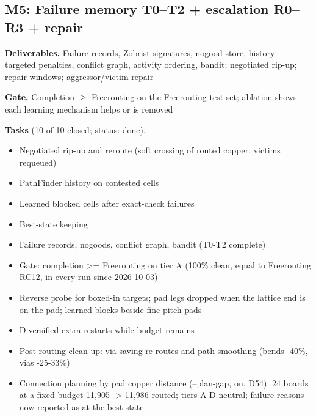 \subsection*{M5: Failure memory T0--T2 + escalation R0--R3 + repair}
\noindent\textbf{Deliverables.} Failure records, Zobrist signatures, nogood store, history + targeted penalties, conflict graph, activity ordering, bandit; negotiated rip-up; repair windows; aggressor/victim repair\par\smallskip
\noindent\textbf{Gate.} Completion $\geq$ Freerouting on the Freerouting test set; ablation shows each learning mechanism helps or is removed\par\smallskip
\noindent\textbf{Tasks} (10 of 10 closed; status: done).
\begin{itemize}[leftmargin=1.6em,itemsep=1pt]
\item[\textcolor{fraqua}{$\checkmark$}] Negotiated rip-up and reroute (soft crossing of routed copper, victims requeued)
\item[\textcolor{fraqua}{$\checkmark$}] PathFinder history on contested cells
\item[\textcolor{fraqua}{$\checkmark$}] Learned blocked cells after exact-check failures
\item[\textcolor{fraqua}{$\checkmark$}] Best-state keeping
\item[\textcolor{fraqua}{$\checkmark$}] Failure records, nogoods, conflict graph, bandit (T0-T2 complete)
\item[\textcolor{fraqua}{$\checkmark$}] Gate: completion \textgreater{}= Freerouting on tier A (100\% clean, equal to Freerouting RC12, in every run since 2026-10-03)
\item[\textcolor{fraqua}{$\checkmark$}] Reverse probe for boxed-in targets; pad legs dropped when the lattice end is on the pad; learned blocks beside fine-pitch pads
\item[\textcolor{fraqua}{$\checkmark$}] Diversified extra restarts while budget remains
\item[\textcolor{fraqua}{$\checkmark$}] Post-routing clean-up: via-saving re-routes and path smoothing (bends -40\%, vias -25-33\%)
\item[\textcolor{fraqua}{$\checkmark$}] Connection planning by pad copper distance (--plan-gap, on, D54): 24 boards at a fixed budget 11,905 -\textgreater{} 11,986 routed; tiers A-D neutral; failure reasons now reported as at the best state
\end{itemize}
